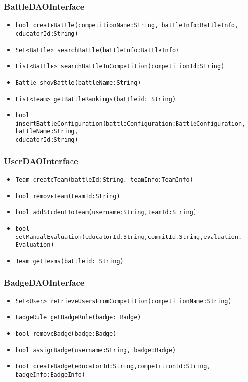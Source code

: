 \subsubsection{BattleDAOInterface}
\begin{itemize}
    \item \texttt{bool createBattle(competitionName:String, battleInfo:BattleInfo,\\educatorId:String)}%
    \item \texttt{Set<Battle> searchBattle(battleInfo:BattleInfo)}
    \item \texttt{List<Battle> searchBattleInCompetition(competitionId:String)}%
    \item \texttt{Battle showBattle(battleName:String)}
    \item \texttt{List<Team> getBattleRankings(battleid: String)}
    \item \texttt{bool insertBattleConfiguration(battleConfiguration:BattleConfiguration, battleName:String,\\educatorId:String)}%
\end{itemize}

\subsubsection{UserDAOInterface}
\begin{itemize}
    \item \texttt{Team createTeam(battleId:String, teamInfo:TeamInfo)}%
    \item \texttt{bool removeTeam(teamId:String)}
    \item \texttt{bool addStudentToTeam(username:String,teamId:String)}%
    \item \texttt{bool setManualEvaluation(educatorId:String,commitId:String,evaluation: Evaluation)}%
    \item \texttt{Team getTeams(battleid: String)}%
\end{itemize}

\subsubsection{BadgeDAOInterface}
\begin{itemize}
    \item \texttt{Set<User> retrieveUsersFromCompetition(competitionName:String)}
    \item \texttt{BadgeRule getBadgeRule(badge: Badge)}
    \item \texttt{bool removeBadge(badge:Badge)}
    \item \texttt{bool assignBadge(username:String, badge:Badge)}
    \item \texttt{bool createBadge(educatorId:String,competitionId:String, badgeInfo:BadgeInfo)}%
\end{itemize}

